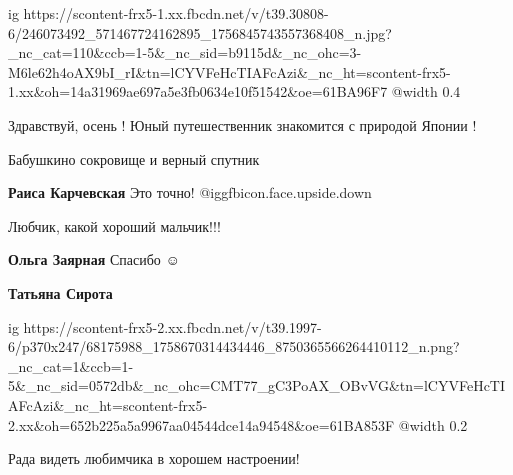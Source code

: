  
 
 
 
 

\ifcmt
  ig https://scontent-frx5-1.xx.fbcdn.net/v/t39.30808-6/246073492_571467724162895_1756845743557368408_n.jpg?_nc_cat=110&ccb=1-5&_nc_sid=b9115d&_nc_ohc=3-M6le62h4oAX9bI_rI&tn=lCYVFeHcTIAFcAzi&_nc_ht=scontent-frx5-1.xx&oh=14a31969ae697a5e3fb0634e10f51542&oe=61BA96F7
	@width 0.4
\fi


Здравствуй, осень ! Юный путешественник знакомится с природой Японии !

Бабушкино сокровище и верный спутник

\textbf{Раиса Карчевская} Это точно! @igg{fbicon.face.upside.down} 

Любчик, какой хороший мальчик!!!

\textbf{Ольга Заярная} Спасибо ☺ ️ 

\textbf{Татьяна Сирота}

\ifcmt
  ig https://scontent-frx5-2.xx.fbcdn.net/v/t39.1997-6/p370x247/68175988_1758670314434446_8750365566264410112_n.png?_nc_cat=1&ccb=1-5&_nc_sid=0572db&_nc_ohc=CMT77_gC3PoAX_OBvVG&tn=lCYVFeHcTIAFcAzi&_nc_ht=scontent-frx5-2.xx&oh=652b225a5a9967aa04544dce14a94548&oe=61BA853F
  @width 0.2
\fi

Рада видеть любимчика в хорошем настроении!

